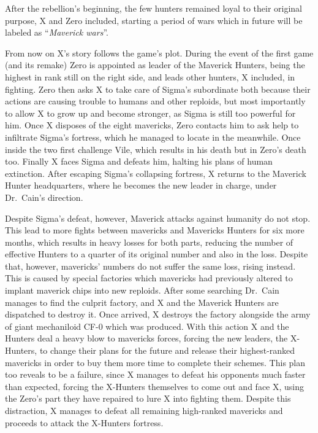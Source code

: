 After the rebellion's beginning, the few hunters remained loyal to their original purpose, X and Zero included, starting a period of wars which in future will be labeled as ``\emph{Maverick wars}''. 

From now on X's story follows the game's plot. During the event of the first game (and its remake) Zero is appointed as leader of the Maverick Hunters, being the highest in rank still on the right side, and leads other hunters, X included, in fighting. Zero then asks  X to take care of Sigma's subordinate both because their actions are causing trouble to humans and other reploids, but most importantly to allow X to grow up and become stronger, as Sigma is still too powerful for him. Once X disposes of the eight mavericks, Zero contacts him to ask help to infiltrate Sigma's fortress, which he managed to locate in the meanwhile. Once inside the two first challenge Vile, which results in his death but in Zero's death too. Finally X faces Sigma and defeats him, halting his plans of human extinction. After escaping Sigma's collapsing fortress, X returns to the Maverick Hunter headquarters, where he becomes the new leader in charge, under Dr.~Cain's direction.

Despite Sigma's defeat, however, Maverick attacks against humanity do not stop. This lead to more fights between mavericks and Mavericks Hunters for six more months, which results in heavy losses for both parts, reducing the number of effective Hunters to a quarter of its original number and also in the loss. Despite that, however, mavericks' numbers do not suffer the same loss, rising instead. This is caused by special factories which mavericks had previously altered to implant maverick chips into new reploids. After some searching Dr.~Cain manages to find the culprit factory, and X and the Maverick Hunters are dispatched to destroy it. Once arrived, X destroys the factory alongside the army of giant mechaniloid CF-0 which was produced. With this action X and the Hunters deal a heavy blow to mavericks forces, forcing the new leaders, the X-Hunters, to change their plans for the future and release their highest-ranked mavericks in order to buy them more time to complete their schemes. This plan too reveals to be a failure, since X manages to defeat his opponents much faster than expected, forcing the X-Hunters themselves to come out and face X, using the Zero's part they have repaired to lure X into fighting them. Despite this distraction, X manages to defeat all remaining high-ranked mavericks and proceeds to attack the X-Hunters fortress. 

